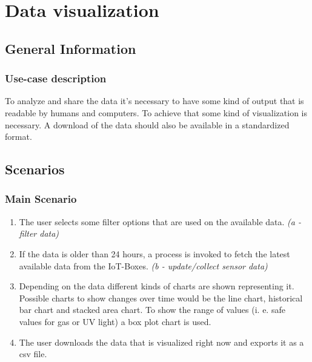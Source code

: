 \documentclass[notitlepage]{article}
\date{}
\author{}
\title{#1}
\newcommand{\name}[1]{%
   \title{#1}
   \maketitle
}
\begin{document}
\name{}

\vspace{-2cm}%

\section{Data visualization}

\subsection{General Information}
\subsubsection{Use-case description}

To analyze and share the data it's necessary to have some kind of output that is readable by humans and computers. To achieve that some kind of visualization is necessary. A download of the data should also be available in a standardized format.

\subsection{Scenarios}

\subsubsection{Main Scenario}

\begin{enumerate}
	\item The user selects some filter options that are used on the available data.
	      \textit{(a - filter data)}
	      
	\item If the data is older than 24 hours, a process is invoked to fetch the latest available data from the IoT-Boxes.
	      \textit{(b - update/collect sensor data)}
	      
	\item Depending on the data different kinds of charts are shown representing it. Possible charts to show changes over time would be the line chart, historical bar chart and stacked area chart. To show the range of values (i. e. safe values for gas or UV light) a box plot chart is used.
	      
	\item The user downloads the data that is visualized right now and exports it as a csv file. 
	      
\end{enumerate}
\end{document}

